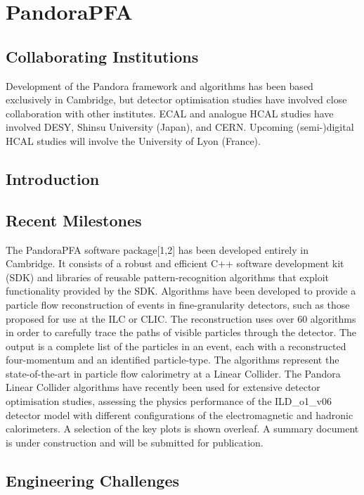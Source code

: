 \section{PandoraPFA}

\subsection{Collaborating Institutions}

Development of the Pandora framework and algorithms has been based exclusively
in Cambridge, but detector optimisation studies have involved close
collaboration with other institutes. ECAL and analogue HCAL studies have
involved DESY, Shinsu University (Japan), and CERN. Upcoming (semi-)digital HCAL
studies will involve the University of Lyon (France).

\subsection{Introduction}
\subsection{Recent Milestones}
The PandoraPFA software package[1,2] has been developed entirely in Cambridge.
It consists of a robust and efficient C++ software development kit (SDK) and
libraries of reusable pattern-recognition algorithms that exploit functionality
provided by the SDK. Algorithms have been developed to provide a particle flow
reconstruction of events in fine-granularity detectors, such as those proposed
for use at the ILC or CLIC. The reconstruction uses over 60 algorithms in order
to carefully trace the paths of visible particles through the detector. The
output is a complete list of the particles in an event, each with a
reconstructed four-momentum and an identified particle-type. The algorithms
represent the state-of-the-art in particle flow calorimetry at a Linear
Collider. The Pandora Linear Collider algorithms have recently been used for
extensive detector optimisation studies, assessing the physics performance of
the ILD_o1_v06 detector model with different configurations of the
electromagnetic and hadronic calorimeters. A selection of the key plots is shown
overleaf. A summary document is under construction and will be submitted for
publication.

\subsection{Engineering Challenges}

